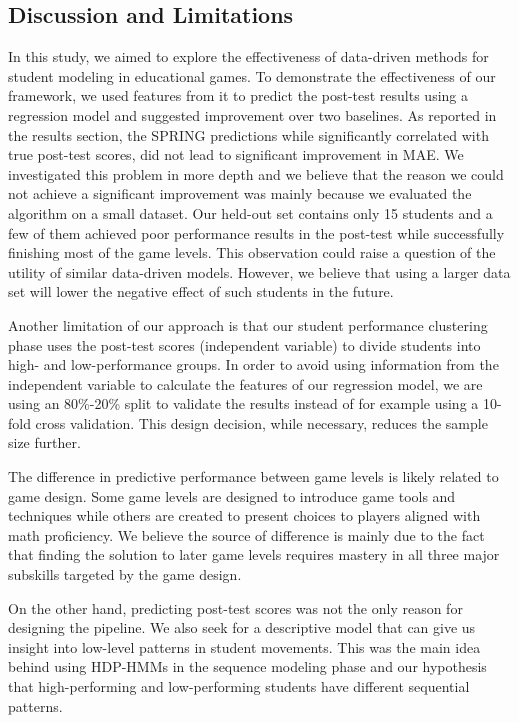 \documentclass{sigchi}
\def\algname{SPRING\xspace}
\begin{document}
	
	\subsection{Discussion and Limitations}
	In this study, we aimed to explore the effectiveness of data-driven methods for student modeling in educational games.
	To demonstrate
	the effectiveness of our framework, we used features from it to predict the post-test results using a regression model and suggested improvement over two baselines.
	As reported in the results section, the \algname predictions while significantly correlated with true post-test scores, did not lead to significant improvement in MAE.
	We investigated this problem in more depth and we believe that the reason we could not achieve a significant improvement was mainly because we evaluated the algorithm on a small dataset. 
	Our held-out set contains only 15 students and a few of them achieved poor performance results in the post-test while successfully finishing most of the game levels.
	This observation could raise a question of the utility of
	similar data-driven models. 
	However, we believe that using a larger data set will lower the negative effect of such students in the future.
	
	Another limitation of our approach is that our student performance clustering phase uses the post-test scores (independent variable) to divide students into high- and low-performance groups. 
	In order to avoid using information from the independent variable to calculate the features of our regression model, we are using an 80\%-20\% split to validate the results instead of for example using a 10-fold cross validation.
	This design decision, while necessary, reduces the
	sample size further.
	
	The difference in predictive performance between game levels is likely related to game design. 
	Some game levels are designed to introduce game tools and techniques while others are created to present choices to players aligned with math proficiency.
	We believe the source of difference is mainly due to the fact that finding the solution to later game levels requires mastery in all three major subskills targeted by the game design.	

	
	On the other hand, predicting post-test scores was not the only reason for designing the pipeline.
	We  also seek for a descriptive model that can give us insight into low-level patterns in student movements. 
	This was the main idea behind using HDP-HMMs in the sequence modeling phase and our hypothesis that high-performing and low-performing students have different sequential patterns.
	 
\end{document}
